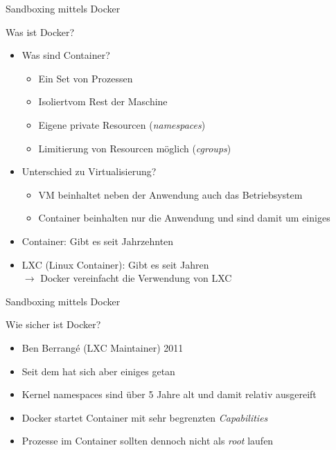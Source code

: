 \begin{frame}{Sandboxing mittels Docker}
  \begin{block}{Was ist Docker?}
    \begin{itemize}[<+->]
      \item Was sind Container?
      \begin{itemize}[<+->]
        \item Ein Set von Prozessen
        \item Isoliert\footnotemark vom Rest der Maschine
        \item Eigene private Resourcen (\textit{namespaces})
        \item Limitierung von Resourcen möglich (\textit{cgroups})
      \end{itemize}
      \item Unterschied zu Virtualisierung?
      \begin{itemize}[<+->]
        \item VM beinhaltet neben der Anwendung auch das Betriebsystem
        \item Container beinhalten nur die Anwendung und sind damit um einiges 
      \end{itemize}
      \item Container: Gibt es seit Jahrzehnten
      \item LXC (Linux Container): Gibt es seit Jahren \\
      $\rightarrow$ Docker vereinfacht die Verwendung von LXC
    \end{itemize}
  \end{block}

\end{frame}

\begin{frame}{Sandboxing mittels Docker}
  \begin{block}{Wie sicher ist Docker?}
    \begin{itemize}[<+->]
      \item {} Ben Berrangé (LXC Maintainer) 2011\footnotemark
      \item Seit dem hat sich aber einiges getan
      \item Kernel namespaces sind über 5 Jahre alt und damit relativ ausgereift
      \item Docker startet Container mit sehr begrenzten \textit{Capabilities}
      \item Prozesse im Container sollten dennoch nicht als \textit{root} laufen
    \end{itemize}
  \end{block}

\end{frame}

